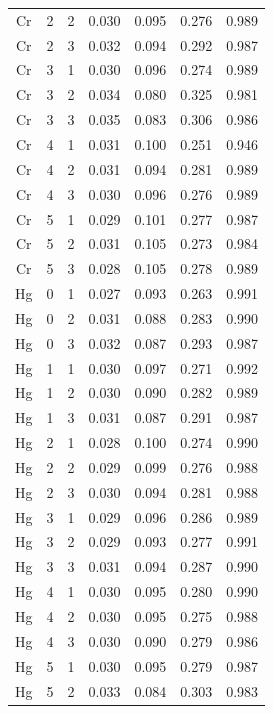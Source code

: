 \documentclass[ms, hidelinks]{uncgdissertationexp3}
\theoremstyle{plain}
\theoremstyle{definition}
\theoremstyle{remark}
\begin{document}
\begin{longtable}{ccccccc}
  Cr & 2 & 2 & 0.030 & 0.095 & 0.276 & 0.989\\
  \rowcolor{gray!6}  Cr & 2 & 3 & 0.032 & 0.094 & 0.292 & 0.987\\
  Cr & 3 & 1 & 0.030 & 0.096 & 0.274 & 0.989\\
  \rowcolor{gray!6}  Cr & 3 & 2 & 0.034 & 0.080 & 0.325 & 0.981\\
  Cr & 3 & 3 & 0.035 & 0.083 & 0.306 & 0.986\\
  \rowcolor{gray!6}  Cr & 4 & 1 & 0.031 & 0.100 & 0.251 & 0.946\\
  Cr & 4 & 2 & 0.031 & 0.094 & 0.281 & 0.989\\
  \rowcolor{gray!6}  Cr & 4 & 3 & 0.030 & 0.096 & 0.276 & 0.989\\
  Cr & 5 & 1 & 0.029 & 0.101 & 0.277 & 0.987\\
  \rowcolor{gray!6}  Cr & 5 & 2 & 0.031 & 0.105 & 0.273 & 0.984\\
  Cr & 5 & 3 & 0.028 & 0.105 & 0.278 & 0.989\\
  \rowcolor{gray!6}  Hg & 0 & 1 & 0.027 & 0.093 & 0.263 & 0.991\\
  Hg & 0 & 2 & 0.031 & 0.088 & 0.283 & 0.990\\
  \rowcolor{gray!6}  Hg & 0 & 3 & 0.032 & 0.087 & 0.293 & 0.987\\
  Hg & 1 & 1 & 0.030 & 0.097 & 0.271 & 0.992\\
  \rowcolor{gray!6}  Hg & 1 & 2 & 0.030 & 0.090 & 0.282 & 0.989\\
  Hg & 1 & 3 & 0.031 & 0.087 & 0.291 & 0.987\\
  \rowcolor{gray!6}  Hg & 2 & 1 & 0.028 & 0.100 & 0.274 & 0.990\\
  Hg & 2 & 2 & 0.029 & 0.099 & 0.276 & 0.988\\
  \rowcolor{gray!6}  Hg & 2 & 3 & 0.030 & 0.094 & 0.281 & 0.988\\
  Hg & 3 & 1 & 0.029 & 0.096 & 0.286 & 0.989\\
  \rowcolor{gray!6}  Hg & 3 & 2 & 0.029 & 0.093 & 0.277 & 0.991\\
  Hg & 3 & 3 & 0.031 & 0.094 & 0.287 & 0.990\\
  \rowcolor{gray!6}  Hg & 4 & 1 & 0.030 & 0.095 & 0.280 & 0.990\\
  Hg & 4 & 2 & 0.030 & 0.095 & 0.275 & 0.988\\
  \rowcolor{gray!6}  Hg & 4 & 3 & 0.030 & 0.090 & 0.279 & 0.986\\
  Hg & 5 & 1 & 0.030 & 0.095 & 0.279 & 0.987\\
  \rowcolor{gray!6}  Hg & 5 & 2 & 0.033 & 0.084 & 0.303 & 0.983\\

\end{longtable}
\end{document}
